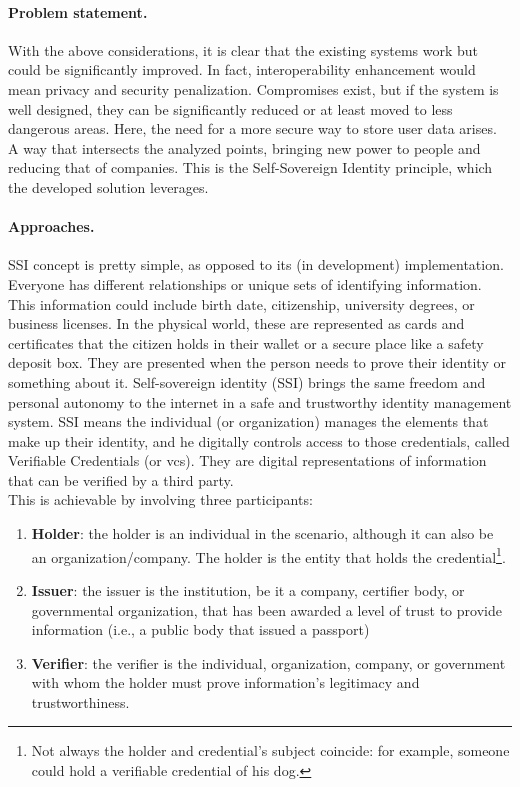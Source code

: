 \paragraph{Problem statement.} With the above considerations, it is clear that 
the existing systems work but could be significantly improved. In fact, 
interoperability enhancement would mean privacy and security penalization. 
Compromises exist, but if the system is well designed, they can be significantly 
reduced or at least moved to less dangerous areas. Here, the need for a more 
secure way to store user data arises. A way that intersects the analyzed points, 
bringing new power to people and reducing that of companies. This is the 
Self-Sovereign Identity principle, which the developed solution leverages.

\paragraph{Approaches.} SSI concept\cite{site:sovrinssi} is pretty simple, as opposed to its 
(in development) implementation. Everyone has different relationships or 
unique sets of identifying information. This information could include 
birth date, citizenship, university degrees, or business licenses. In the 
physical world, these are represented as cards and certificates that the 
citizen holds in their wallet or a secure place like a safety deposit 
box. They are presented when the person needs to prove their identity or 
something about it. Self-sovereign identity (SSI) brings the same freedom and 
personal autonomy to the internet in a safe and trustworthy identity management 
system. SSI means the individual (or organization) manages the elements that 
make up their identity, and he digitally controls access to those credentials,
called Verifiable Credentials (or \acrshort{vc}s). They are digital representations of
information that can be verified by a third party.
\vspace*{1cm}\\
This is achievable by involving three participants:
\begin{enumerate}
    \item \textbf{Holder}: the holder is an individual in the scenario, 
    although it can also be an organization/company. The holder is the 
    entity that holds the credential\footnote{Not always the holder and 
    credential's subject coincide: for example, someone could hold a verifiable 
    credential of his dog.}.
    \item \textbf{Issuer}: the issuer is the institution, be it a company, 
    certifier body, or governmental organization, that has been awarded a 
    level of trust to provide information (i.e., a public body that issued 
    a passport)
    \item \textbf{Verifier}: the verifier is the individual, organization,
    company, or government with whom the holder must prove information's 
    legitimacy and trustworthiness.
\end{enumerate}
